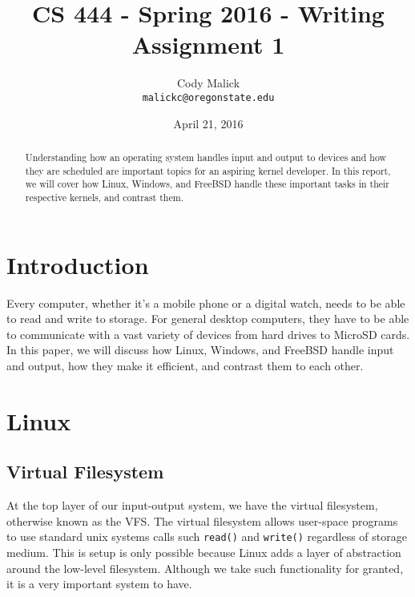 

% 
\begin{titlepage}
  \title{CS 444 - Spring 2016 - Writing Assignment 1}
  \author{Cody Malick\\
  \texttt{malickc@oregonstate.edu}}
  \date{April 21, 2016}
  \maketitle
  \vspace*{4cm}
  \begin{abstract}
      \noindent Understanding how an operating system handles input and output
      to devices and how they are scheduled are important topics for an aspiring
      kernel developer. In this report, we will cover how Linux, Windows, and
      FreeBSD handle these important tasks in their respective kernels,
      and contrast them.
  \end{abstract}
\end{titlepage}

\tableofcontents
\clearpage
\section{Introduction}
Every computer, whether it's a mobile phone or a digital watch, needs to be able
to read and write to storage. For general desktop computers, they have to be able
to communicate with a vast variety of devices from hard drives to MicroSD cards.
In this paper, we will discuss how Linux, Windows, and FreeBSD handle input and
output, how they make it efficient, and contrast them to each other.
\section{Linux}
  \subsection{Virtual Filesystem}
  At the top layer of our input-output system, we have the virtual filesystem,
  otherwise known as the VFS. The virtual filesystem allows user-space programs
  to use standard unix systems calls such \texttt{read()} and \texttt{write()}
  regardless of storage medium. This is setup is only possible because Linux
  adds a layer of abstraction around the low-level filesystem. Although we take
  such functionality for granted, it is a very important system to have.
  \cite{robertlove2010}

